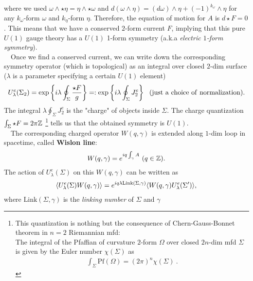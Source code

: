 \documentclass{ltjsarticle}
\theoremstyle{mystyle} %
\numberwithin{equation}{section}
\begin{document}
where we used $\omega\wedge \star \eta = \eta\wedge \star \omega$ and 
$d(\omega\wedge \eta) = (d\omega)\wedge \eta + (-1)^{k_\omega} \wedge \eta$ for 
any $k_\omega$-form $\omega$ and $k_\eta$-form $\eta$. 
Therefore, the equation of motion for $A$ is $d\star F=0$. 
This means that we have a conserved $2$-form current $F$, implying that this pure $U(1)$ gauge theory has a $U(1)$ 1-form symmetry (a.k.a \textit{electric $1$-form symmetry}). \\
　Once we find a conserved current, we can write down the corresponding symmetry operator (which is topological) as an integral over closed $2$-dim surface 
($\lambda$ is a parameter specifying a certain $U(1)$ element)
\begin{align}
    U^{e}_{\lambda}(\Sigma_2) = \exp\left\{{i\lambda\oint_{\Sigma}\frac{\star F}{g}}\right\}=: \exp\left\{{i\lambda\oint_{\Sigma}J^e_2}\right\} ~~
    (\mathrm{just~a~choice~of~normalization}). 
    \label{electric1form}
\end{align}
The integral $\lambda\oint_{\Sigma}J^e_2$ is the "charge" of objects inside $\Sigma$. 
The charge quantization $\int_{\Sigma} \star F = 2\pi \mathbb{Z}$
\footnote{This quantization is nothing but the consequence of Chern-Gauss-Bonnet theorem in $n=2$ Riemannian mfd: \\
The integral of the Pfaffian of curvature $2$-form $\Omega$ over closed $2n$-dim mfd $\Sigma$ is given by the Euler number $\chi(\Sigma)$ as 
\begin{align}
    \int_{\Sigma} \mathrm{Pf}(\Omega) = (2\pi)^n \chi(\Sigma)~. 
\end{align}}
 tells us that the obtained symmetry is $U(1)$. \\
　The corresponding charged operator $W(q, \gamma)$ is extended along $1$-dim loop in spacetime, called \textbf{Wislon line}: 
  \begin{align}
    W(q, \gamma)=e^{iq\int_{\gamma}A}~(q\in \mathbb{Z}). 
  \end{align}
  The action of $U^{e}_\lambda(\Sigma)$ on this $W(q, \gamma)$ can be written as
  \begin{align}
    \langle{U^e_{\lambda}(\Sigma)W(q, \gamma)}\rangle=e^{iq\lambda\mathrm{Link}(\Sigma, \gamma)}\langle{W(q, \gamma)U^e_{\lambda}(\Sigma')}\rangle, 
    \label{ActionWlison} 
  \end{align}
  where $\mathrm{Link}(\Sigma, \gamma)$ is the \textit{linking number} of $\Sigma$ and $\gamma$
\end{document}
